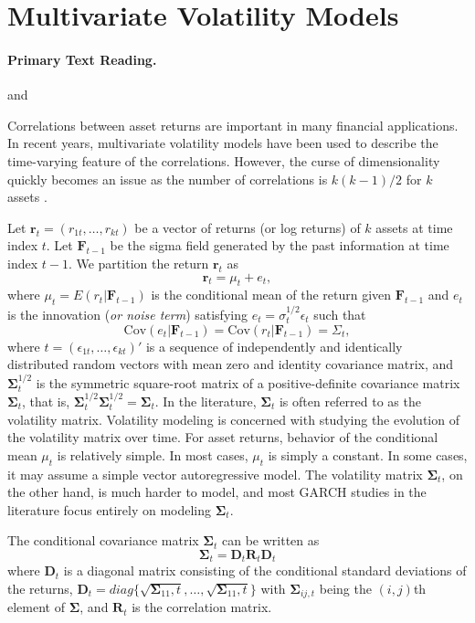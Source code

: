 \section{Multivariate Volatility Models}
\paragraph{Primary Text Reading.} 
and 

Correlations between asset returns are important in many financial applications. In recent years, multivariate volatility models have been used to describe the time-varying feature of the correlations. However, the curse of dimensionality quickly becomes an issue as the number of correlations is $k(k -1)/2$ for $k$ assets \cite{tsay2006mvm}.

Let $\mathbf{r}_t = (r_{1t}, \ldots , r_{kt})$ be a vector of returns (or log returns) of $k$ assets at time index $t$. Let $\mathbf{F}_{t-1}$ be the sigma field generated by the past information at time index $t-1$. We partition the return $\mathbf{r}_t$ as
\begin{equation}
\mathbf{r}_t = \mu_t + e_t,
\end{equation}
where $\mu_t = E(r_t | \mathbf{F}_{t-1} )$ is the conditional mean of the return given $\mathbf{F}_{t-1}$ and $e_t$ is the innovation (\emph{or noise term}) satisfying $e_t = \sigma^{1/2}_t \epsilon_t$ such that 
\[
\text{Cov}(e_t | \mathbf{F}_{t-1} ) = \text{Cov}(r_t | \mathbf{F}_{t-1} ) = \Sigma_t,
\]
where $t = (\epsilon_{1t}, \ldots, \epsilon_{kt})'$ is a sequence of independently and identically distributed random vectors with mean zero and identity covariance matrix, and $\mathbf{\Sigma}^{1/2}_t$ is the symmetric square-root matrix of a positive-definite covariance matrix $\mathbf{\Sigma}_t$, that is, $\mathbf{\Sigma}^{1/2}_t \mathbf{\Sigma}^{1/2}_t = \mathbf{\Sigma}_t$. In the literature, $\mathbf{\Sigma}_t$ is often referred to as the volatility matrix. Volatility modeling is concerned with studying the evolution of the volatility matrix  over time. For asset returns, behavior of the conditional mean $\mu_t$ is relatively simple. 
In most cases, $\mu_t$ is simply a constant. In some cases, it may assume a simple vector autoregressive model. The volatility matrix $\mathbf{\Sigma}_t$, on the other hand, is much harder to model, and most GARCH studies in the literature focus entirely on modeling $\mathbf{\Sigma}_t$.

The conditional covariance matrix $\mathbf{\Sigma}_t$ can be written as 
\begin{equation}
\mathbf{\Sigma}_t = \mathbf{D}_t \mathbf{R}_t \mathbf{D}_t
\label{eq:cond-covar-matrix}
\end{equation}
where $\mathbf{D}_t$ is a diagonal matrix consisting of the conditional standard deviations of the returns, $\mathbf{D}_t = diag\{\sqrt{\mathbf{\Sigma}_{11},t}, \ldots, \sqrt{\mathbf{\Sigma}_{11},t}\}$ with $\mathbf{\Sigma}_{ij,t}$ being the $(i, j)$th element 
of $\mathbf{\Sigma}$, and $\mathbf{R}_t$ is the correlation matrix. 

